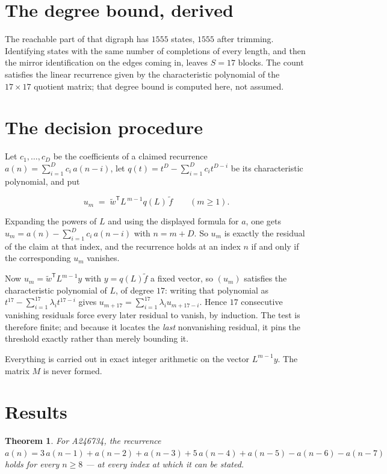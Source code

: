 \documentclass[11pt]{article}
\newtheorem{theorem}{Theorem}
\theoremstyle{definition}
\begin{document}
\section{The degree bound, derived}

The reachable part of that digraph has $1555$ states, $1555$ after trimming. Identifying states with the same number of completions of every length, and then the mirror identification on the edges coming in, leaves $S = 17$ blocks. The count satisfies the linear recurrence given by the characteristic polynomial of the $17\times17$ quotient matrix; that degree bound is computed here, not assumed.

\section{The decision procedure}

Let $c_1,\dots,c_D$ be the coefficients of a claimed recurrence $a(n) = \sum_{i=1}^{D} c_i\,a(n-i)$, let $q(t) = t^{D} - \sum_{i=1}^{D} c_i t^{D-i}$ be its characteristic polynomial, and put

\[u_m \;=\; \tilde w^{\mathsf T} L^{\,m-1} q(L)\,\tilde f \qquad (m \ge 1).\]

Expanding the powers of $L$ and using the displayed formula for $a$, one gets $u_m = a(n) - \sum_{i=1}^{D} c_i\,a(n-i)$ with $n = m + D$. So $u_m$ is exactly the residual of the claim at that index, and the recurrence holds at an index $n$ if and only if the corresponding $u_m$ vanishes.

Now $u_m = \tilde w^{\mathsf T} L^{m-1} y$ with $y = q(L)\tilde f$ a fixed vector, so $(u_m)$ satisfies the characteristic polynomial of $L$, of degree $17$: writing that polynomial as $t^{17} - \sum_{i=1}^{17} \lambda_i t^{17-i}$ gives $u_{m+17} = \sum_{i=1}^{17} \lambda_i u_{m+17-i}$. Hence $17$ consecutive vanishing residuals force every later residual to vanish, by induction. The test is therefore finite; and because it locates the {\itshape last} nonvanishing residual, it pins the threshold exactly rather than merely bounding it.

Everything is carried out in exact integer arithmetic on the vector $L^{m-1}y$. The matrix $M$ is never formed.

\section{Results}

\begin{theorem} For A246734, the recurrence $a(n) = 3\,a(n-1) + a(n-2) + a(n-3) + 5\,a(n-4) + a(n-5) - a(n-6) - a(n-7)$ holds for every $n \ge 8$ --- at every index at which it can be stated.\end{theorem}
\end{document}
